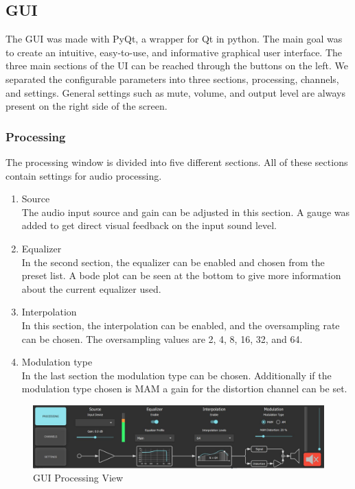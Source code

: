 
\newpage
\subsection{GUI}
The GUI was made with PyQt, a wrapper for Qt in python. The main goal was to create an intuitive, easy-to-use, and informative graphical user interface. 
The three main sections of the UI can be reached through the buttons on the left. We separated the configurable parameters into three sections, processing, channels, and settings. General settings such as mute, volume, and output level are always present on the right side of the screen. 
\subsubsection{Processing}
The processing window is divided into five different sections. All of these sections contain settings for audio processing.
\begin{enumerate}
    \item Source \\
    The audio input source and gain can be adjusted in this section. A gauge was added to get direct visual feedback on the input sound level.
    \item Equalizer \\
     In the second section, the equalizer can be enabled and chosen from the preset list. A bode plot can be seen at the bottom to give more information about the current equalizer used. 
    \item Interpolation \\
    In this section, the interpolation can be enabled, and the oversampling rate can be chosen. The oversampling values are 2, 4, 8, 16, 32, and 64.
    \item Modulation type \\
    In the last section the modulation type can be chosen. Additionally if the modulation type chosen is MAM a gain for the distortion channel can be set. 
\end{enumerate}

\begin{figure}[h!]
    \centering
    \includegraphics[width=\textwidth]{images/4_Design/GUI_Processing.JPG}
    \caption{GUI Processing View}
    \label{4_fig:gui_processing}
\end{figure}

